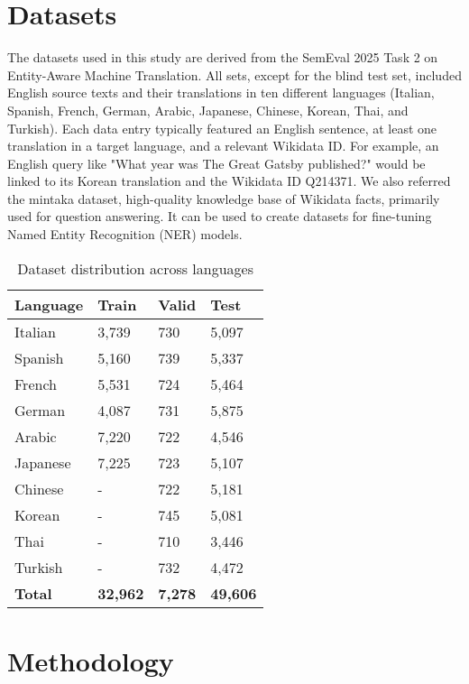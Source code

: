 \documentclass{ecai}
\begin{document}
\section{Datasets}
\label{sec:datasets}
The datasets used in this study are derived from the SemEval 2025 Task 2 on Entity-Aware Machine Translation.
All sets, except for the blind test set, included English source texts and their translations in ten 
different languages (Italian, Spanish, French, German, Arabic, Japanese, Chinese, Korean, Thai, and Turkish). 
Each data entry typically featured an English sentence, at least one translation in a target language, 
and a relevant Wikidata ID. 
For example, an English query like "What year was The Great Gatsby published?" 
would be linked to its Korean translation and the Wikidata ID Q214371. We also referred the mintaka\cite{sen-etal-2022-mintaka} dataset,
high-quality knowledge base of Wikidata facts, primarily used for question answering. It can be used to create
datasets for fine-tuning Named Entity Recognition (NER) models.
\begin{table}[h!]
\centering
\begin{tabular}{ll@{\hspace{8mm}}ll}
\hline
\textbf{Language} & \textbf{Train} & \textbf{Valid} & \textbf{Test} \\
\hline
Italian & 3,739 & 730 & 5,097 \\
Spanish & 5,160 & 739 & 5,337 \\
French & 5,531 & 724 & 5,464 \\
German & 4,087 & 731 & 5,875 \\
Arabic & 7,220 & 722 & 4,546 \\
Japanese & 7,225 & 723 & 5,107 \\
Chinese & - & 722 & 5,181 \\
Korean & - & 745 & 5,081 \\
Thai & - & 710 & 3,446 \\
Turkish & - & 732 & 4,472 \\
\hline
\textbf{Total} & \textbf{32,962} & \textbf{7,278} & \textbf{49,606} \\
\hline
\end{tabular}
\caption{Dataset distribution across languages}
\label{tab:dataset_distribution}
\end{table}

\section{Methodology}
\label{sec:methodology}
\end{document}

